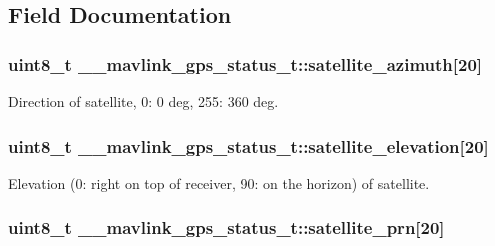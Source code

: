 \subsection{Field Documentation}
\hypertarget{struct____mavlink__gps__status__t_a956bcb507823363c6dd78318ecbd0ff4}{
\subsubsection[{satellite\+\_\+azimuth}]{\setlength{\rightskip}{0pt plus 5cm}uint8\+\_\+t \+\_\+\+\_\+mavlink\+\_\+gps\+\_\+status\+\_\+t\+::satellite\+\_\+azimuth\mbox{[}20\mbox{]}}}\label{struct____mavlink__gps__status__t_a956bcb507823363c6dd78318ecbd0ff4}


Direction of satellite, 0\+: 0 deg, 255\+: 360 deg. 

\hypertarget{struct____mavlink__gps__status__t_aa0df643ba0353ad8affab5768675b9ea}{
\subsubsection[{satellite\+\_\+elevation}]{\setlength{\rightskip}{0pt plus 5cm}uint8\+\_\+t \+\_\+\+\_\+mavlink\+\_\+gps\+\_\+status\+\_\+t\+::satellite\+\_\+elevation\mbox{[}20\mbox{]}}}\label{struct____mavlink__gps__status__t_aa0df643ba0353ad8affab5768675b9ea}


Elevation (0\+: right on top of receiver, 90\+: on the horizon) of satellite. 

\hypertarget{struct____mavlink__gps__status__t_a1a615b66354df8f0bfb0c269251b1f21}{
\subsubsection[{satellite\+\_\+prn}]{\setlength{\rightskip}{0pt plus 5cm}uint8\+\_\+t \+\_\+\+\_\+mavlink\+\_\+gps\+\_\+status\+\_\+t\+::satellite\+\_\+prn\mbox{[}20\mbox{]}}}\label{struct____mavlink__gps__status__t_a1a615b66354df8f0bfb0c269251b1f21}


